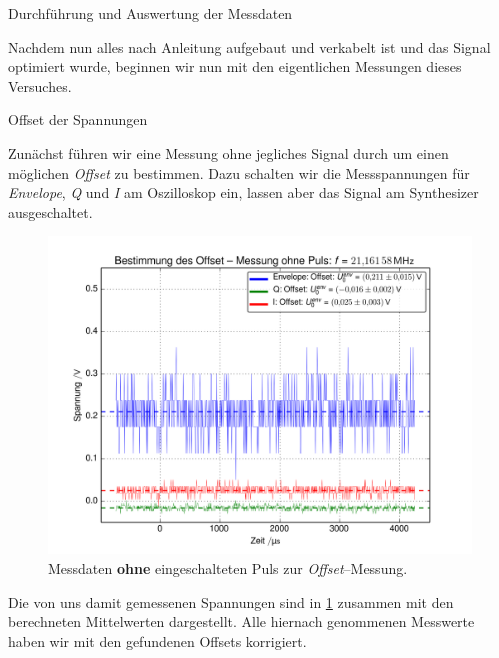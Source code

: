 \documentclass[pdftex, a4paper,11pt, twoside, ngerman]{report}
\begin{document}
  
  \newpage
  \begin{chapter}{Durchführung und Auswertung der Messdaten}
    \label{chp:Auswertung}
    
    Nachdem nun alles nach Anleitung aufgebaut und verkabelt ist und das Signal
    optimiert wurde, beginnen wir nun mit den eigentlichen Messungen dieses
    Versuches.
    
    \begin{section}{Offset der Spannungen}
      \label{chpOffset}
      
      Zunächst führen wir eine Messung ohne jegliches Signal durch um einen
      möglichen \textit{Offset} zu bestimmen.
      Dazu schalten wir die Messspannungen für \textit{Envelope}, \textit{Q} und
      \textit{I} am Oszilloskop ein, lassen aber das Signal am Synthesizer
      ausgeschaltet.
      \begin{figure}[hb]
        \centering
        \includegraphics[width=\textwidth]{Figures/Offset.png}
        \caption{Messdaten \textbf{ohne} eingeschalteten Puls zur
          \textit{Offset}--Messung.}
        \label{figOffset}
      \end{figure}
      
      Die von uns damit gemessenen Spannungen sind in \cref{figOffset} zusammen
      mit den berechneten Mittelwerten dargestellt.
      Alle hiernach genommenen Messwerte haben wir mit den gefundenen
      Offsets korrigiert.
      

\end{section}
\end{chapter}
\end{document}
